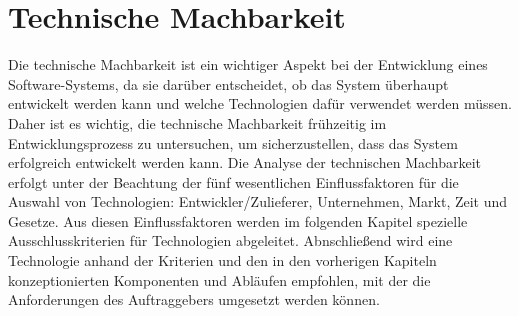 \section{Technische Machbarkeit}
Die technische Machbarkeit ist ein wichtiger Aspekt bei der Entwicklung eines Software-Systems, da sie darüber entscheidet, ob das System überhaupt entwickelt werden kann und welche Technologien dafür verwendet werden müssen. Daher ist es wichtig, die technische Machbarkeit frühzeitig im Entwicklungsprozess zu untersuchen, um sicherzustellen, dass das System erfolgreich entwickelt werden kann.
Die Analyse der technischen Machbarkeit erfolgt unter der Beachtung der fünf wesentlichen Einflussfaktoren für die Auswahl von Technologien: Entwickler/Zulieferer, Unternehmen, Markt, Zeit und Gesetze.
\newparagraph
Aus diesen Einflussfaktoren werden im folgenden Kapitel spezielle Ausschlusskriterien für Technologien abgeleitet.
Abnschließend wird eine Technologie anhand der Kriterien und den in den vorherigen Kapiteln konzeptionierten Komponenten und Abläufen empfohlen, mit der die Anforderungen des Auftraggebers umgesetzt werden können.


